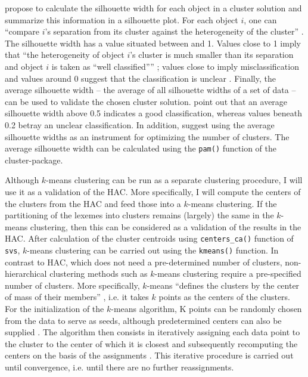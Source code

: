 \citet{kaufman_finding_1990} propose to calculate the silhouette width for each object in a cluster solution and summarize this information in a silhouette plot. For each object $i$, one can “compare $i$’s separation from its cluster against the heterogeneity of the cluster” \citep[138]{everitt_cluster_2011}. The silhouette width has a value situated between  and 1. Values close to 1 imply that “the heterogeneity of object $i$’s cluster is much smaller than its separation and object $i$ is taken as ``well classified''” \citep[128]{everitt_cluster_2011}; values close to  imply misclassification and values around 0 suggest that the classification is unclear \citep[128]{everitt_cluster_2011}. Finally, the average silhouette width – the average of all silhouette widths of a set of data – can be used to validate the chosen cluster solution. \citet{kaufman_finding_1990} point out that an average silhouette width above 0.5 indicates a good classification, whereas values beneath 0.2 betray an unclear classification. In addition, \citet[129]{everitt_cluster_2011} suggest using the average silhouette widths as an instrument for optimizing the number of clusters. The average silhouette width can be calculated using the \texttt{pam()} function of the cluster{}-package.\largerpage

Although $k$-means clustering can be run as a separate clustering procedure, I will use it as a validation of the HAC. More specifically, I will compute the centers of the clusters from the HAC and feed those into a $k$-means clustering. If the partitioning of the lexemes into clusters remains (largely) the same in the $k$-means clustering, then this can be considered as a validation of the results in the HAC. After calculation of the cluster centroids using \texttt{centers\_ca()} function of \texttt{svs}, $k$-means clustering can be carried out using the \texttt{kmeans()} function. In contrast to HAC, which does not need a pre-determined number of clusters, non-hierarchical clustering methods such as $k$-means clustering require a pre-specified number of clusters. More specifically, $k$-means “defines the clusters by the center of mass of their members” \citep[515]{manning_foundations_1999}, i.e. it takes $k$ points as the centers of the clusters. For the initialization of the $k$-means algorithm, K points can be randomly chosen from the data to serve as seeds, although predetermined centers can also be supplied \citep[515]{manning_foundations_1999}. The algorithm then consists in iteratively assigning each data point to the cluster to the center of which it is closest \citep[515]{manning_foundations_1999} and subsequently recomputing the centers on the basis of the assignments \citep[515--516]{manning_foundations_1999}. This iterative procedure is carried out until convergence, i.e. until there are no further reassignments.

